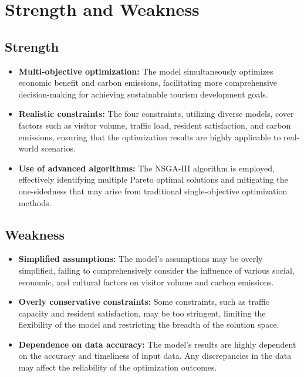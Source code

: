 \documentclass{mcmthesis}
\begin{document}
\section{Strength and Weakness}

\subsection{Strength}

\begin{itemize}
\item \textbf{Multi-objective optimization:} The model simultaneously optimizes economic benefit and carbon emissions, facilitating more comprehensive decision-making for achieving sustainable tourism development goals.
\item \textbf{Realistic constraints:} The four constraints, utilizing diverse models, cover factors such as visitor volume, traffic load, resident satisfaction, and carbon emissions, ensuring that the optimization results are highly applicable to real-world scenarios.
\item \textbf{Use of advanced algorithms:} The NSGA-III algorithm is employed, effectively identifying multiple Pareto optimal solutions and mitigating the one-sidedness that may arise from traditional single-objective optimization methods.
\end{itemize}

\subsection{Weakness}

\begin{itemize}
\item \textbf{Simplified assumptions:} The model's assumptions may be overly simplified, failing to comprehensively consider the influence of various social, economic, and cultural factors on visitor volume and carbon emissions.
\item \textbf{Overly conservative constraints:} Some constraints, such as traffic capacity and resident satisfaction, may be too stringent, limiting the flexibility of the model and restricting the breadth of the solution space.
\item \textbf{Dependence on data accuracy:} The model's results are highly dependent on the accuracy and timeliness of input data. Any discrepancies in the data may affect the reliability of the optimization outcomes.
\end{itemize}
\end{document}
